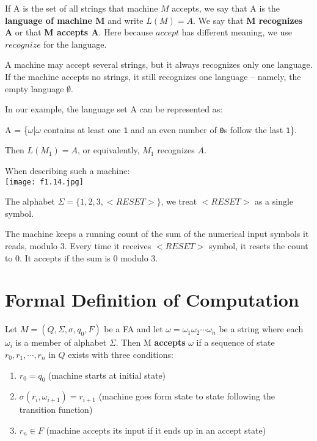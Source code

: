 If A is the set of all strings that machine \(M\) accepts, we say that A is the \textbf{language of machine M} and write \(L(M) = A\).   
We say that \textbf{M recognizes A} or that \textbf{M accepts A}.     
Here because \(accept\) has different meaning, we use \(recognize\) for the language.  

\begin{remark}
    A machine may accept several strings, but it always recognizes only one language.
    If the machine accepts no strings, it still recognizes one language -- namely, the empty language \(\emptyset\). 
\end{remark}

\begin{eg}
    In our example, the language set A can be represented as:

    A = \{\(\omega\)|\(\omega\) contains at least one \verb|1| and an even number of \verb|0|s follow the last \verb|1|\}.

    Then \(L(M_1) = A\), or equivalently, \(M_1\) recognizes \(A\).   
\end{eg}

\begin{eg}
    When describing such a machine:\\
    \texttt{[image: f1.14.jpg]}

    The alphabet \(\Sigma = \{ 1, 2, 3, <RESET> \} \), we treat \(<RESET>\) as a single symbol.  

    The machine keeps a running count of the sum of the numerical input symbols it reads, modulo 3.
    Every time it receives \(<RESET>\) symbol, it resets the count to 0. 
    It accepts if the sum is 0 modulo 3.
\end{eg}

\section{Formal Definition of Computation}

Let \(M = (Q, \Sigma, \sigma, q_0, F)\) be a FA and let \(\omega = \omega_1\omega_2\cdots\omega_n\)  be a string where each \(\omega_i\) is a member of alphabet \(\Sigma\).   
Then M \textbf{accepts} \(\omega\) if a sequence of state \(r_0, r_1, \cdots, r_n\) in \(Q\)  exists with three conditions:
\begin{enumerate}
    \item \(r_0 = q_0\) (machine starts at initial state) 
    \item \(\sigma(r_i, \omega_{i+1}) = r_{i+1}\)  (machine goes form state to state following the transition function)
    \item \(r_n \in F\) (machine accepts its input if it ends up in an accept state)
\end{enumerate}   


